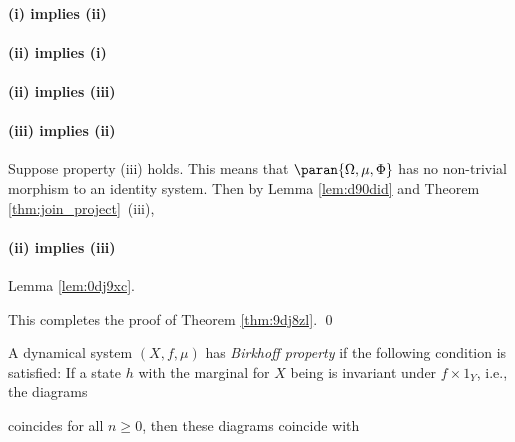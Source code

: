 \documentclass[12pt,oneside,pb-diagram]{article}
\begin{document}
\paragraph{(i) implies (ii)}

\paragraph{(ii) implies (i)}

\paragraph{(ii) implies (iii)}

\paragraph{(iii) implies (ii)} Suppose property (iii) holds. This means that $\paran{\Omega, \mu, \Phi}$ has no non-trivial morphism to an identity system. Then by Lemma \ref{lem:d90did} and Theorem \ref{thm:join_project}~(iii), 

\paragraph{(ii) implies (iii)} Lemma \ref{lem:0dj9xc}.

This completes the proof of Theorem \ref{thm:9dj8zl}. \qed

\begin{definition} 
	A dynamical system $(X, f, \mu)$ has \emph{Birkhoff property} if the following condition is satisfied: If a state $h$ with the marginal for $X$ being is invariant under $f \times 1_Y$, i.e., the diagrams
	
	\begin{center}
	\end{center}
	coincides for all $n \geq 0$, then these diagrams coincide with
	\begin{center}
		
	\end{center}
\end{definition}
\end{document}
